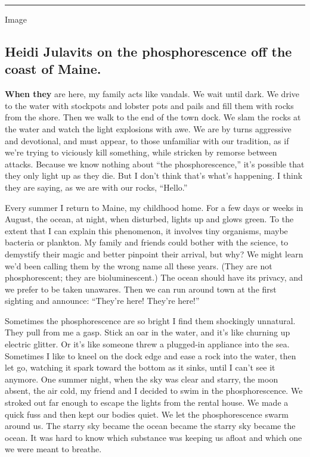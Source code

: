 \begin{center}\rule{0.5\linewidth}{\linethickness}\end{center}

Image

\hypertarget{heidi-julavits-on-the-phosphorescence-off-the-coast-of-maine}{%
\subsection{Heidi Julavits on the phosphorescence off the coast of
Maine.}\label{heidi-julavits-on-the-phosphorescence-off-the-coast-of-maine}}

\textbf{When they} are here, my family acts like vandals. We wait until
dark. We drive to the water with stockpots and lobster pots and pails
and fill them with rocks from the shore. Then we walk to the end of the
town dock. We slam the rocks at the water and watch the light explosions
with awe. We are by turns aggressive and devotional, and must appear, to
those unfamiliar with our tradition, as if we're trying to viciously
kill something, while stricken by remorse between attacks. Because we
know nothing about ``the phosphorescence,'' it's possible that they only
light up as they die. But I don't think that's what's happening. I think
they are saying, as we are with our rocks, ``Hello.''

Every summer I return to Maine, my childhood home. For a few days or
weeks in August, the ocean, at night, when disturbed, lights up and
glows green. To the extent that I can explain this phenomenon, it
involves tiny organisms, maybe bacteria or plankton. My family and
friends could bother with the science, to demystify their magic and
better pinpoint their arrival, but why? We might learn we'd been calling
them by the wrong name all these years. (They are not phosphorescent;
they are bioluminescent.) The ocean should have its privacy, and we
prefer to be taken unawares. Then we can run around town at the first
sighting and announce: ``They're here! They're here!''

Sometimes the phosphorescence are so bright I find them shockingly
unnatural. They pull from me a gasp. Stick an oar in the water, and it's
like churning up electric glitter. Or it's like someone threw a
plugged-in appliance into the sea. Sometimes I like to kneel on the dock
edge and ease a rock into the water, then let go, watching it spark
toward the bottom as it sinks, until I can't see it anymore. One summer
night, when the sky was clear and starry, the moon absent, the air cold,
my friend and I decided to swim in the phosphorescence. We stroked out
far enough to escape the lights from the rental house. We made a quick
fuss and then kept our bodies quiet. We let the phosphorescence swarm
around us. The starry sky became the ocean became the starry sky became
the ocean. It was hard to know which substance was keeping us afloat and
which one we were meant to breathe.

